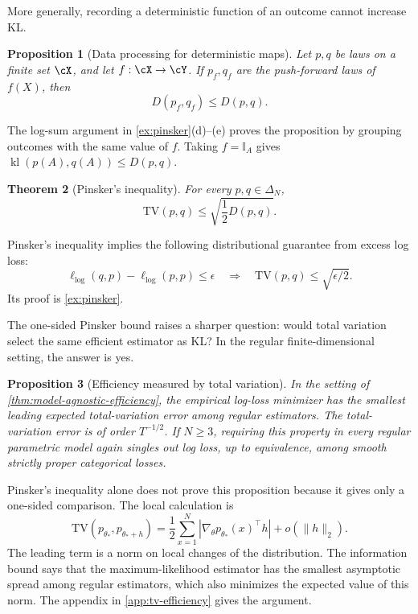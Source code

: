 \documentclass[11pt,twoside]{article}
\newcommand{\I}{\mathbb I}
\newcommand{\KL}{D}
\newcommand{\TV}{\mathrm{TV}}
\newtheorem{theorem}{Theorem}[section]
\newtheorem{proposition}[theorem]{Proposition}
\theoremstyle{definition}
\theoremstyle{remark}
\begin{document}
More generally, recording a deterministic function of an outcome cannot
increase KL.
\begin{proposition}[Data processing for deterministic maps]
\label{prop:kl-data-processing}
Let \(p,q\) be laws on a finite set \(\cX\), and let
\(f:\cX\to\cY\). If \(p_f,q_f\) are the push-forward laws of \(f(X)\), then
\[
  \KL(p_f,q_f)\le \KL(p,q).
\]
\end{proposition}
The log-sum argument in \cref{ex:pinsker}(d)--(e) proves the proposition by
grouping outcomes with the same value of \(f\). Taking \(f=\I_A\) gives
\(\operatorname{kl}(p(A),q(A))\le \KL(p,q)\).

\begin{theorem}[Pinsker's inequality]
\label{thm:pinsker}
For every $p,q\in\Delta_N$,
\begin{equation}
\TV(p,q)
\le \sqrt{\frac12\KL(p, q)}.
\label{eq:pinsker}
\end{equation}
\end{theorem}

Pinsker's inequality implies the following distributional guarantee from
excess log loss:
\begin{equation}
\ell_{\log}(q,p)-\ell_{\log}(p,p)\le\epsilon
\quad\Longrightarrow\quad
\TV(p,q)\le\sqrt{\epsilon/2}.
\label{eq:log-to-tv}
\end{equation}
Its proof is \cref{ex:pinsker}.

The one-sided Pinsker bound raises a sharper question: would total variation
select the same efficient estimator as KL? In the regular finite-dimensional
setting, the answer is yes.

\begin{proposition}[Efficiency measured by total variation]
\label{prop:tv-efficiency}
In the setting of \cref{thm:model-agnostic-efficiency}, the empirical log-loss
minimizer has the smallest leading expected total-variation error among regular
estimators. The total-variation error is of order $T^{-1/2}$. If $N\ge3$,
requiring this property in every regular parametric model again singles out log
loss, up to equivalence, among smooth strictly proper categorical losses.
\end{proposition}

Pinsker's inequality alone does not prove this proposition because it gives
only a one-sided comparison. The local calculation is
\begin{equation}
\TV(p_{\theta_*},p_{\theta_*+h})
=\frac12\sum_{x=1}^N
\left|\nabla_\theta p_{\theta_*}(x)^\top h\right|
+o(\lVert h\rVert_2).
\label{eq:local-tv-expansion}
\end{equation}
The leading term is a norm on local changes of the distribution. The
information bound says that the maximum-likelihood estimator has the smallest
asymptotic spread among regular estimators, which also minimizes the expected
value of this norm. The appendix in \cref{app:tv-efficiency} gives the argument.
\end{document}
